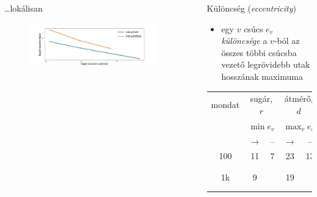 \documentclass{beamer}
\newlength{\sepwid}
\newlength{\onecolwid}
\newlength{\twocolwid}
\begin{document}
\begin{frame}[t]
\begin{columns}[t]
\begin{column}{\onecolwid}
\begin{block}{\dots lokálisan}
\begin{figure}
              \includegraphics[width=\columnwidth]{img/trans}
          \end{figure}
        \end{block}
      \end{column}

    \begin{column}{\sepwid} \end{column}   %

      \begin{column}{\twocolwid} %

        \begin{columns} %
          \begin{column}{\onecolwid}

            \begin{block}{Különcség (\emph{eccentricity})}
              \begin{itemize}
                \item egy $v$ csúcs $e_v$ \emph{különcsége} 
                  a $v$-ból az összes többi csúcsba vezető legrövidebb utak
                        hosszának maximuma
              \end{itemize}
              \begin{table}
                \begin{tabular}{ccccccc}
                  \toprule
                      mondat & \multicolumn{2}{c}{sugár, $r$} &
                      \multicolumn{2}{c}{átmérő, $d$} &
                      center  & periféria \\   
                      & \multicolumn{2}{c}{$\min e_v$} & \multicolumn{2}{c}{$\max_v
                      e_v$} & $\{v\mid e_v=r\}$ & $\{v\mid e_v=d\}$\\ 
                      & $\rightarrow$ & -- & $\rightarrow$ & -- \\
                      \midrule
                      100 & 11 & 7 & 23 & 13 & \{\texttt ., \texttt !, \texttt ?\} &
                      \{nádcukorból\}\\
                      1k  &  9 &   & 19 &    & \{\texttt ,\} & \{Megadható, two\}\\
                      \bottomrule 
                \end{tabular}
              \end{table} 
            \end{block}
          \end{column} 


\end{columns}
\end{column}
\end{columns}
\end{frame}
\end{document}
